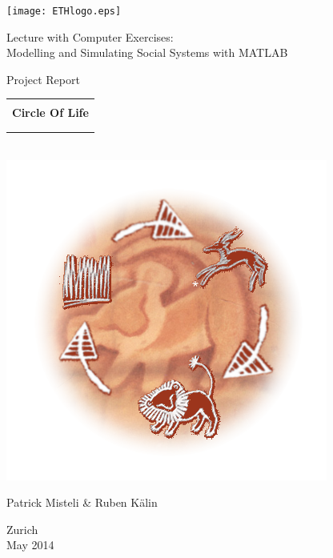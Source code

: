 
\thispagestyle{empty}

\begin{center}
\texttt{[image: ETHlogo.eps]}

\bigskip


\bigskip


\bigskip


\LARGE{ 	Lecture with Computer Exercises:\\ }
\LARGE{ Modelling and Simulating Social Systems with MATLAB\\}

\bigskip

\bigskip

\small{Project Report}\\

\bigskip

\bigskip

\bigskip

\bigskip


\begin{tabular}{|c|}
\hline
\\
\textbf{\LARGE{Circle Of Life}}\\
\textbf{\LARGE{}}\\
\\
\hline
\end{tabular}
\bigskip
\\
\includegraphics{images/circleEdited.png}
\bigskip

\bigskip

\LARGE{Patrick Misteli \& Ruben K{\"a}lin}



\bigskip

\bigskip

\bigskip

\bigskip

\bigskip

\bigskip

\bigskip

\bigskip

Zurich\\
May 2014\\

\end{center}


